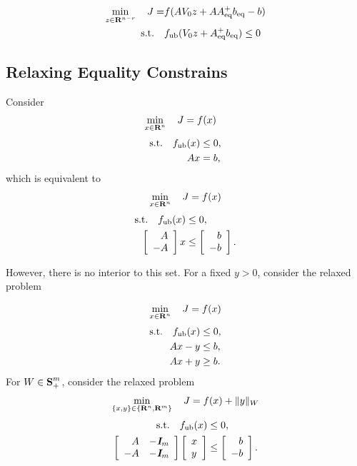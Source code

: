 \documentclass{article}
\begin{document}
    \begin{align*}
        \min_{z\in\textbf{R}^{n-r}}\quad J=&f(AV_0 z+AA_{\text{eq}}^+b_{\text{eq}}-b)\\
        \text{s.t.}\quad & f_{\text{ub}}(V_0 z+A_{\text{eq}}^+b_{\text{eq}})\leq 0
    \end{align*}

\subsection{Relaxing Equality Constrains}

    Consider
    \begin{align*}
        \min_{x\in\textbf{R}^{n}}\quad J &= f(x)
    \end{align*}
    \begin{align*}
        \text{s.t.}\quad f_{\text{ub}}(x)&\leq0,\\
        A x&=b,
    \end{align*}
    which is equivalent to
    \begin{align*}
        \min_{x\in\textbf{R}^{n}}\quad J = f(x)
    \end{align*}
    \begin{align*}
        \st\quad f_\ub(x)&\leq0,\\
        \mat{\minus A\\-A} x&\leq\mat{\minus b\\ -b}.
    \end{align*}
    
    However, there is no interior to this set. 
    For a fixed $y>0$, consider the relaxed problem
    
    \begin{align*}
        \min_{x\in\textbf{R}^{n}}\quad J = f(x)
    \end{align*}
    \begin{align*}
        \text{s.t.}\quad f_{\text{ub}}(x)&\leq0,\\
        A x-y&\leq b,\\
        A x+y&\geq b.
    \end{align*}
    For $W\in\textbf{S}_+^m$, consider the relaxed problem
    \begin{align*}
        \min_{\{x,y\}\in\{\textbf{R}^n,\textbf{R}^m\}}\quad J = f(x)+\|y\|_W
    \end{align*}
    \begin{align*}
        \st\quad f_\ub(x)&\leq0,\\
        \mat{\minus A & -\eye_m 
        \\ 
        -A & -\eye_m 
        }\mat{x\\y}
        &\leq
        \mat{\minus b \\ -b}.
    \end{align*}
    
\end{document}
